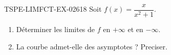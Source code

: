 \begin{exercice}{TSPE-LIMFCT-EX-026}{1}{8}
Soit $f(x) = \dfrac{x}{x^2 + 1}$.
\begin{enumerate}
  \item Déterminer les limites de $f$ en $+\infty$ et en $-\infty$.
  \item La courbe admet-elle des asymptotes ? Preciser.
\end{enumerate}
\end{exercice}
